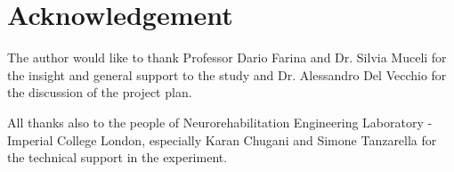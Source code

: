 \documentclass[conference]{IEEEtran}
\begin{document}
\section*{Acknowledgement}
The author would like to thank Professor Dario Farina and Dr. Silvia Muceli for the insight and general support to the study and Dr. Alessandro Del Vecchio for the discussion of the project plan.

All thanks also to the people of Neurorehabilitation Engineering Laboratory - Imperial College London, especially Karan Chugani and Simone Tanzarella for the technical support in the experiment.


\begin{thebibliography}{00}



\end{thebibliography}
\end{document}
